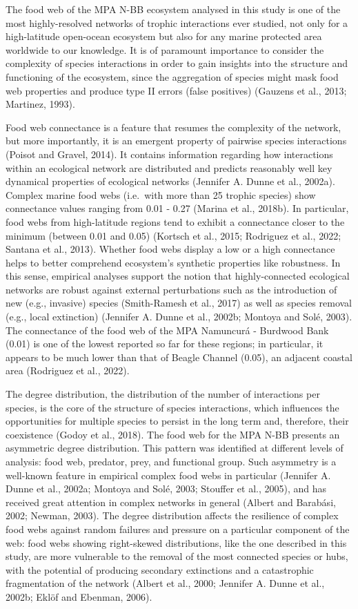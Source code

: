 \documentclass[preprint, 3p,
authoryear]{elsarticle} %
\begin{document}
The food web of the MPA N-BB ecosystem analysed in this study is one of
the most highly-resolved networks of trophic interactions ever studied,
not only for a high-latitude open-ocean ecosystem but also for any
marine protected area worldwide to our knowledge. It is of paramount
importance to consider the complexity of species interactions in order
to gain insights into the structure and functioning of the ecosystem,
since the aggregation of species might mask food web properties and
produce type II errors (false positives) (Gauzens et al., 2013;
Martinez, 1993).

Food web connectance is a feature that resumes the complexity of the
network, but more importantly, it is an emergent property of pairwise
species interactions (Poisot and Gravel, 2014). It contains information
regarding how interactions within an ecological network are distributed
and predicts reasonably well key dynamical properties of ecological
networks (Jennifer A. Dunne et al., 2002a). Complex marine food webs
(i.e.~with more than 25 trophic species) show connectance values ranging
from 0.01 - 0.27 (Marina et al., 2018b). In particular, food webs from
high-latitude regions tend to exhibit a connectance closer to the
minimum (between 0.01 and 0.05) (Kortsch et al., 2015; Rodriguez et al.,
2022; Santana et al., 2013). Whether food webs display a low or a high
connectance helps to better comprehend ecosystem's synthetic properties
like robustness. In this sense, empirical analyses support the notion
that highly-connected ecological networks are robust against external
perturbations such as the introduction of new (e.g., invasive) species
(Smith-Ramesh et al., 2017) as well as species removal (e.g., local
extinction) (Jennifer A. Dunne et al., 2002b; Montoya and Solé, 2003).
The connectance of the food web of the MPA Namuncurá - Burdwood Bank
(0.01) is one of the lowest reported so far for these regions; in
particular, it appears to be much lower than that of Beagle Channel
(0.05), an adjacent coastal area (Rodriguez et al., 2022).

The degree distribution, the distribution of the number of interactions
per species, is the core of the structure of species interactions, which
influences the opportunities for multiple species to persist in the long
term and, therefore, their coexistence (Godoy et al., 2018). The food
web for the MPA N-BB presents an asymmetric degree distribution. This
pattern was identified at different levels of analysis: food web,
predator, prey, and functional group. Such asymmetry is a well-known
feature in empirical complex food webs in particular (Jennifer A. Dunne
et al., 2002a; Montoya and Solé, 2003; Stouffer et al., 2005), and has
received great attention in complex networks in general (Albert and
Barabási, 2002; Newman, 2003). The degree distribution affects the
resilience of complex food webs against random failures and pressure on
a particular component of the web: food webs showing right-skewed
distributions, like the one described in this study, are more vulnerable
to the removal of the most connected species or hubs, with the potential
of producing secondary extinctions and a catastrophic fragmentation of
the network (Albert et al., 2000; Jennifer A. Dunne et al., 2002b; Eklöf
and Ebenman, 2006).
\end{document}
